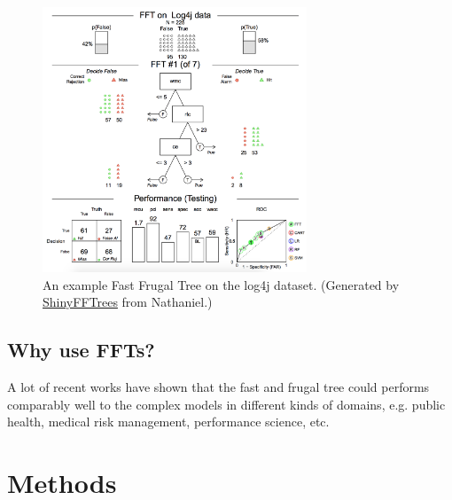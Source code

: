 \documentclass[table, xcdraw, sigconf,review, anonymous]{acmart}
\begin{document}
        
        
        \begin{figure}[!t]
            \centering
            \includegraphics[width=3.1in]{img/fft-demo.png}
            \caption{An example Fast Frugal Tree on the log4j dataset. 
            (Generated by 
            \href{https://econpsychbasel.shinyapps.io/ShinyFFTrees/}{ShinyFFTrees} 
            from Nathaniel.)
            }
            \label{fig:fft-demo}
        \end{figure}
    
    \subsection{Why use FFTs?}
        A lot of recent works have shown that the fast and frugal tree 
        could performs comparably well to the complex models in different kinds of domains, e.g. public health, medical risk management, performance science, etc.~\cite{jenny2013simple, laskey2014comparing, raab2015power}


\section{Methods}
\end{document}
